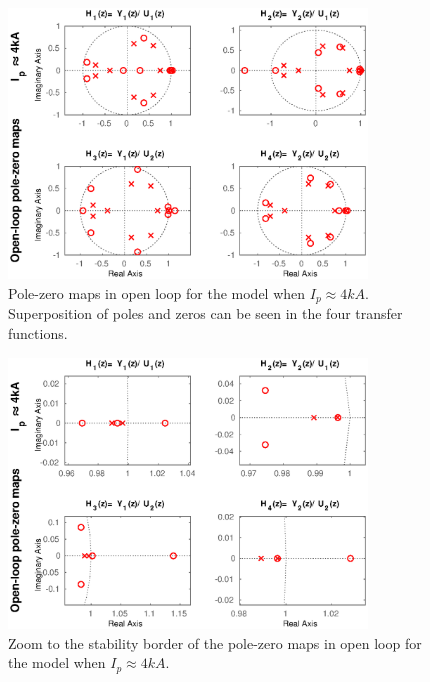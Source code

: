 \begin{figure}
	\centering
	\includegraphics[width=0.85\textwidth]{Chp5/PoleZero/PoleZeroOpenPos.eps}
	\caption{  Pole-zero maps in open loop for the model when $I_p\approx 4 kA$. Superposition  of poles and zeros can be seen in the four transfer functions. \label{PoleZeroOpenPos}}
\end{figure}	

\begin{figure}
	\centering
	\includegraphics[width=0.85\textwidth]{Chp5/PoleZero/PoleZeroOpenPosZoom.eps}
	\caption{Zoom to the stability border of the pole-zero maps in open loop for the model when $I_p\approx 4 kA$. \label{PoleZeroOpenPosZoom}}
\end{figure}

